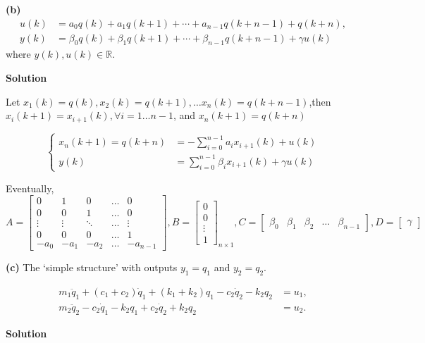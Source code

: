\documentclass[12pt,a4paper]{article}
\begin{document}
\textbf{(b)}
\[
\begin{aligned}
u(k) &= a_0q(k)+a_1q(k+1)+\cdots+a_{n-1}q(k+n-1)+q(k+n),\\
y(k) &= \beta_0q(k)+\beta_1q(k+1)+\cdots+\beta_{n-1}q(k+n-1)+\gamma u(k)
\end{aligned}
\]
where $y(k),u(k)\in\mathbb{R}$.

\textbf{Solution}

Let $ x_1(k) = q(k), x_2(k) = q(k +1), \dots x_{n}(k) = q(k + n - 1) $,\newline then $x_i(k + 1) = x_{i + 1}(k), \forall i = 1 \dots n - 1$, and $x_n(k + 1) = q(k + n)$

\[
\begin{cases}
	x_n(k + 1) = q(k + n) &= -\displaystyle\sum_{i = 0}^{n - 1} a_i x_{i + 1}(k) + u(k) \\
	y(k) &=  \displaystyle\sum_{i = 0}^{n - 1} \beta_i x_{i + 1}(k) + \gamma u(k)
\end{cases}
\]

Eventually, 
\[
A = \begin{bmatrix}
	0 & 1 &   0 &\dots & 0 \\
	0 & 0 &   1 & \dots &0 \\
	\vdots & \vdots & \ddots & \dots&\vdots \\
	0 & 0 & 0 &  \dots  & 1 \\
	-a_0 & -a_1 & -a_2 & \dots & -a_{n - 1}
\end{bmatrix}, B = \begin{bmatrix}
	0 \\ 0 \\ \vdots \\ 1
\end{bmatrix}_{n \times 1}, C = \begin{bmatrix}
	\beta_0 & \beta_1 & \beta_2 & \dots & \beta_{n - 1}
\end{bmatrix}, D = \begin{bmatrix}
	\gamma
\end{bmatrix}
\]

\textbf{(c)} The `simple structure' with outputs $y_1=q_1$ and $y_2=q_2$.

\[
\begin{aligned}
m_1\ddot q_1+(c_1+c_2)\dot q_1+(k_1+k_2)q_1-c_2\dot q_2-k_2q_2 &= u_1,\\
m_2\ddot q_2-c_2\dot q_1-k_2q_1+c_2\dot q_2+k_2q_2 &= u_2.
\end{aligned}
\]

\textbf{Solution}
\end{document}
